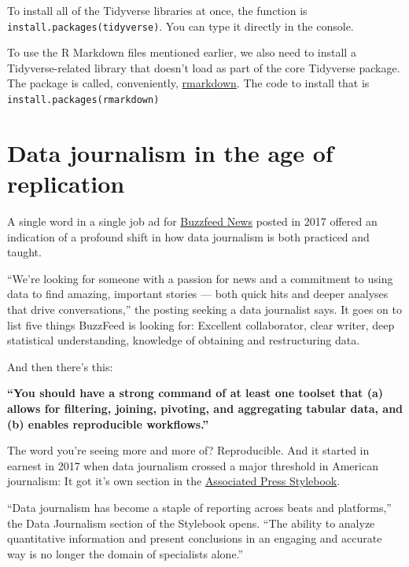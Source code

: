 \documentclass[
  letterpaper,
  DIV=11,
  numbers=noendperiod]{scrreprt}
\begin{document}
To install all of the Tidyverse libraries at once, the function is
\texttt{install.packages(\textquotesingle{}tidyverse\textquotesingle{})}.
You can type it directly in the console.

To use the R Markdown files mentioned earlier, we also need to install a
Tidyverse-related library that doesn't load as part of the core
Tidyverse package. The package is called, conveniently,
\href{https://rmarkdown.rstudio.com/docs/}{rmarkdown}. The code to
install that is
\texttt{install.packages(\textquotesingle{}rmarkdown\textquotesingle{})}


\hypertarget{data-journalism-in-the-age-of-replication}{%
\chapter{Data journalism in the age of
replication}\label{data-journalism-in-the-age-of-replication}}

A single word in a single job ad for
\href{https://www.buzzfeednews.com/}{Buzzfeed News} posted in 2017
offered an indication of a profound shift in how data journalism is both
practiced and taught.

``We're looking for someone with a passion for news and a commitment to
using data to find amazing, important stories --- both quick hits and
deeper analyses that drive conversations,'' the posting seeking a data
journalist says. It goes on to list five things BuzzFeed is looking for:
Excellent collaborator, clear writer, deep statistical understanding,
knowledge of obtaining and restructuring data.

And then there's this:

\textbf{``You should have a strong command of at least one toolset that
(a) allows for filtering, joining, pivoting, and aggregating tabular
data, and (b) enables reproducible workflows.''}

The word you're seeing more and more of? Reproducible. And it started in
earnest in 2017 when data journalism crossed a major threshold in
American journalism: It got it's own section in the
\href{https://www.apstylebook.com/}{Associated Press Stylebook}.

``Data journalism has become a staple of reporting across beats and
platforms,'' the Data Journalism section of the Stylebook opens. ``The
ability to analyze quantitative information and present conclusions in
an engaging and accurate way is no longer the domain of specialists
alone.''
\end{document}
